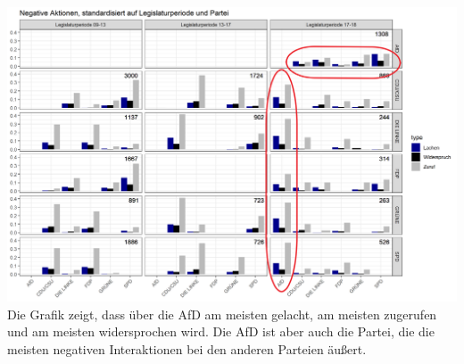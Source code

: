 \includegraphics[width=\linewidth]{Grafiken/13_17negativ_perc_bunt.png}\\

Die Grafik zeigt, dass über die AfD am meisten gelacht, am meisten zugerufen und am meisten widersprochen wird. Die AfD ist aber auch die Partei, die die meisten negativen Interaktionen bei den anderen Parteien äußert. 




